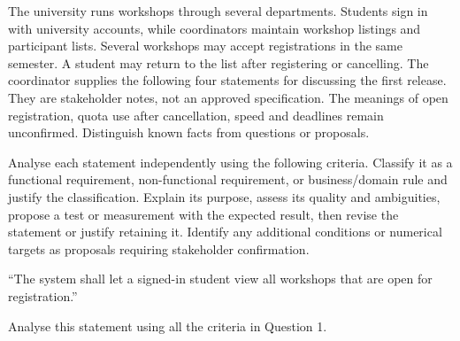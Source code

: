 \begin{contenttable}
{The university runs workshops through several departments. Students sign in with university accounts, while coordinators maintain workshop listings and participant lists. Several workshops may accept registrations in the same semester. A student may return to the list after registering or cancelling. The coordinator supplies the following four statements for discussing the first release. They are stakeholder notes, not an approved specification.}
{The meanings of open registration, quota use after cancellation, speed and deadlines remain unconfirmed. Distinguish known facts from questions or proposals.}
\end{contenttable}
{Analyse each statement independently using the following criteria.}
{Classify it as a functional requirement, non-functional requirement, or business/domain rule and justify the classification. Explain its purpose, assess its quality and ambiguities, propose a test or measurement with the expected result, then revise the statement or justify retaining it. Identify any additional conditions or numerical targets as proposals requiring stakeholder confirmation.}

\begin{contenttable}
{“The system shall let a signed-in student view all workshops that are open for registration.”}

\end{contenttable}
{Analyse this statement using all the criteria in Question 1.}

